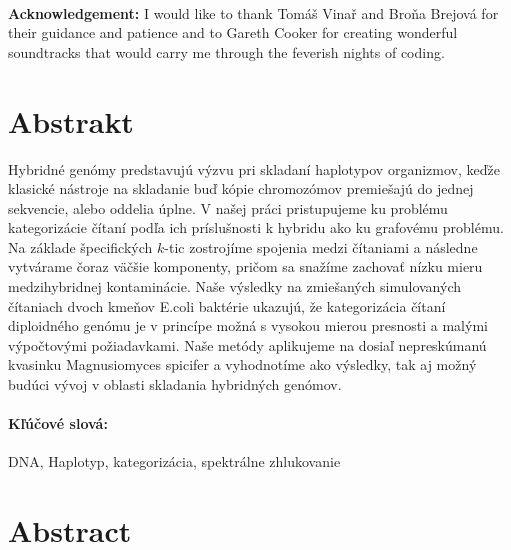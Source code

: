 \documentclass[12pt, oneside]{book}
\theoremstyle{definition}
\begin{document}


\frontmatter

\setcounter{page}{3}
~

\vfill
{\bf Acknowledgement:} I would like to thank Tomáš Vinař and Broňa Brejová for their guidance and patience and to Gareth Cooker for creating wonderful soundtracks that would carry me through the feverish nights of coding.


\newpage 
\section*{Abstrakt}

Hybridné genómy predstavujú výzvu pri skladaní haplotypov organizmov, keďže klasické 
nástroje na skladanie buď kópie chromozómov premiešajú do jednej sekvencie, alebo oddelia úplne.
V našej práci pristupujeme ku problému kategorizácie čítaní podľa ich príslušnosti k hybridu ako ku grafovému problému. Na základe špecifických $k$-tic zostrojíme spojenia medzi čítaniami a následne vytvárame čoraz väčšie komponenty, pričom sa snažíme zachovať nízku mieru medzihybridnej kontaminácie. Naše výsledky na zmiešaných simulovaných čítaniach dvoch kmeňov E.coli baktérie ukazujú, že kategorizácia čítaní diploidného genómu je v princípe možná s vysokou mierou presnosti a malými výpočtovými požiadavkami.	
Naše metódy aplikujeme na dosiaľ nepreskúmanú kvasinku Magnusiomyces spicifer a vyhodnotíme ako výsledky, tak aj možný budúci vývoj v oblasti skladania hybridných genómov.

\paragraph*{Kľúčové slová:} DNA, Haplotyp, kategorizácia, spektrálne zhlukovanie


\newpage 
\section*{Abstract}
\end{document}
